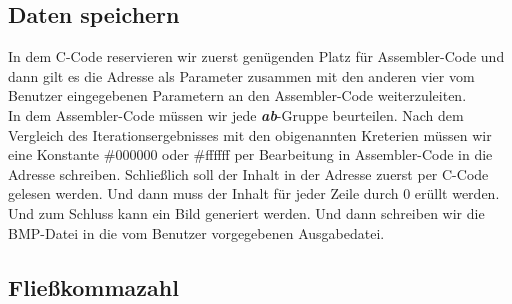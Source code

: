 \documentclass[course=erap]{aspdoc}
\begin{document}
 \subsection{Daten speichern}
 In dem C-Code reservieren wir zuerst genügenden Platz für Assembler-Code und dann gilt es die Adresse als Parameter zusammen mit den anderen vier vom Benutzer eingegebenen Parametern an den Assembler-Code weiterzuleiten.
\\In dem Assembler-Code müssen wir jede \textbf{\emph{ab}}-Gruppe beurteilen. Nach dem Vergleich des Iterationsergebnisses mit den obigenannten Kreterien müssen wir eine Konstante \#000000 oder \#ffffff per Bearbeitung in Assembler-Code in die Adresse schreiben. Schließlich soll der Inhalt in der Adresse zuerst per C-Code gelesen werden. Und dann muss der Inhalt für jeder Zeile durch 0 erüllt werden. Und zum Schluss kann ein Bild generiert werden. Und dann schreiben wir die BMP-Datei in die vom Benutzer vorgegebenen Ausgabedatei.
\subsection{Fließkommazahl}
\end{document}
